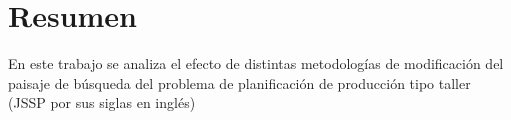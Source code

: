 \chapter*{Resumen}
En este trabajo se analiza el efecto de distintas metodologías de modificación del paisaje de búsqueda del problema de planificación de producción tipo taller (JSSP por sus siglas en inglés) 
\let\cleardoublepage\clearpage



